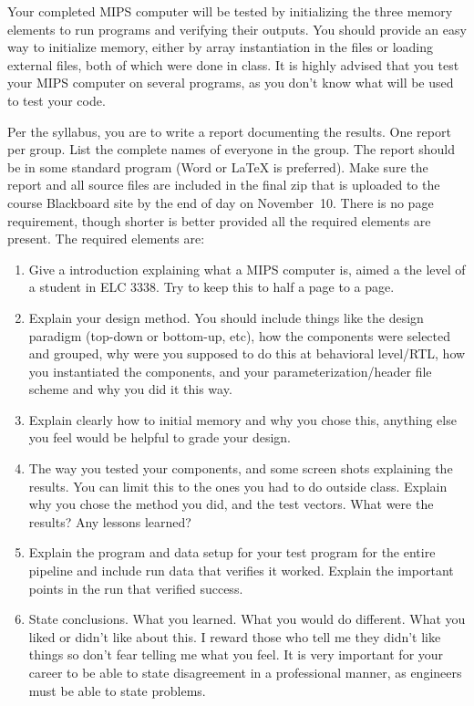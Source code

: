Your completed MIPS computer will be tested by initializing the three memory elements to run programs and verifying their outputs.  You should provide an easy way to initialize memory, either by array instantiation in the files or loading external files, both of which were done in class.  It is highly advised that you test your MIPS computer on several programs, as you don't know what will be used to test your code.

Per the syllabus, you are to write a report documenting the results.  One report per group.  List the complete names of everyone in the group.  The report should be in some standard program (Word or {\LaTeX} is preferred).  Make sure the report and all source files are included in the final zip that is uploaded to the course Blackboard site by the end of day on November~10.  There is no page requirement, though shorter is better provided all the required elements are present.    The required elements are:
\begin{enumerate}
\item Give a introduction explaining what a MIPS computer is, aimed a the level of a student in ELC 3338.  Try to keep this to half a page to a page.
\item Explain your design method.  You should include things like the design paradigm (top-down or bottom-up, etc), how the components were selected and grouped, why were you supposed to do this at behavioral level/RTL, how you instantiated the components, and your parameterization/header file scheme and why you did it this way.
\item Explain clearly how to initial memory and why you chose this, anything else you feel would be helpful to grade your design.
\item The way you tested your components, and some screen shots explaining the results.  You can limit this to the ones you had to do outside class.  Explain why you chose the method you did, and the test vectors.  What were the results?  Any lessons learned?
\item Explain the program and data setup for your test program for the entire pipeline and include run data that verifies it worked.  Explain the important points in the run that verified success.
\item State conclusions.  What you learned.  What you would do different.  What you liked or didn't like about this.  I reward those who tell me they didn't like things so don't fear telling me what you feel.  It is very important for your career to be able to state disagreement in a professional manner, as engineers must be able to state problems.
\end{enumerate}


